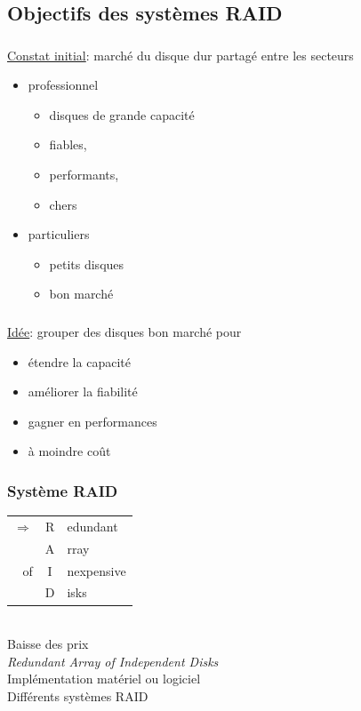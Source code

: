 \subsection{Objectifs des systèmes RAID}
\begin{frame}
  \frametitle{\insertsubsection}
  \underline{Constat initial}: marché du disque dur partagé entre les secteurs
  \begin{itemize}
  \item \alert{professionnel} 
    \begin{itemize}
    \item disques de grande capacité
    \item fiables, 
    \item performants, 
    \item[\ding{212}] \alert{chers}
    \end{itemize}
  \item \alert{ particuliers}
    \begin{itemize}
    \item petits disques
    \item bon marché
    \end{itemize}
  \end{itemize}
\end{frame}

\begin{frame}
  \frametitle{\insertsubsection}
  \underline{Idée}: \alert{grouper des disques} bon marché pour 
  \begin{itemize}
  \item étendre la \alert{capacité}
  \item améliorer la \alert{fiabilité}
  \item gagner en \alert{performances}
  \item à moindre coût
  \end{itemize}
\end{frame}

\begin{frame}
  \frametitle{Système RAID}
  \large
  \begin{tabular}{r|c|l}
    $\Rightarrow$ & R&edundant \\ & A&rray \\ of &I&nexpensive \\ & D&isks
    \end{tabular}
  \normalsize
  \newline\\
  \vspace{0.5cm}
  Baisse des prix\\  \emph{Redundant Array of \alert{Independent} Disks}\\
  \vspace{0.5cm}
  Implémentation matériel ou logiciel\\
  \vspace{0.5cm}
  Différents systèmes RAID
\end{frame}

